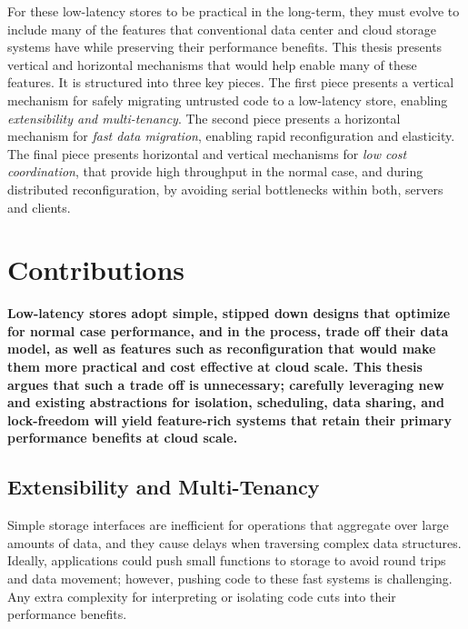 For these low-latency stores to be practical in the long-term, they must evolve to
include many of the features that conventional data center and cloud
storage systems have while preserving their performance benefits.
%
This thesis presents vertical and horizontal mechanisms that
would help enable many of these features.
%
It is structured into three key pieces.
%
The first piece presents a vertical mechanism for safely migrating
untrusted code to a low-latency store, enabling \emph{extensibility
and multi-tenancy}.
%
The second piece presents a horizontal mechanism for \emph{fast data
migration}, enabling rapid reconfiguration and elasticity.
%
The final piece presents horizontal and vertical mechanisms for \emph{low cost
coordination}, that provide high throughput in the normal case, and during distributed
reconfiguration, by avoiding serial bottlenecks within both, servers and
clients.

\section{Contributions}

{\bf
  Low-latency stores adopt simple, stipped down designs that optimize
  for normal case performance, and in the process, trade off their
  data model, as well as features such as reconfiguration that
  would make them more practical and cost effective at cloud scale.
%
  This thesis argues that such a trade off is unnecessary; carefully
  leveraging new and existing abstractions for isolation, scheduling,
  data sharing, and lock-freedom will yield feature-rich systems that
  retain their primary performance benefits at cloud scale.
}

\subsection{Extensibility and Multi-Tenancy}

%
%
Simple storage interfaces are inefficient for operations
that aggregate over large amounts of data, and they cause delays
when traversing complex data structures.
%
Ideally, applications could push small functions to storage to avoid
round trips and data movement; however, pushing code to these
fast systems is challenging.
%
Any extra complexity for interpreting
or isolating code cuts into their performance benefits.


